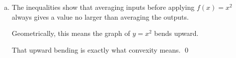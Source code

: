 \documentclass[12pt]{article}
\begin{document}
\begin{enumerate}[(a)]
Summing over all pairs $i<j$,
every square term appears exactly $(n-1)$ times, so
\[
2\sum_{i<j}x_ix_j
\leq
(n-1)\sum_{i=1}^n x_i^2.
\]

Therefore
\[
(x_1+\cdots+x_n)^2
\leq
n\sum_{i=1}^n x_i^2.
\]

Dividing by $n^2$ gives
\[
\left(
\frac{x_1+\cdots+x_n}{n}
\right)^2
\leq
\frac{x_1^2+\cdots+x_n^2}{n}.
\]

\item The inequalities show that averaging inputs before applying $f(x)=x^2$
always gives a value no larger than averaging the outputs.

Geometrically, this means the graph of $y=x^2$ bends upward.

That upward bending is exactly what convexity means. \qed

\end{enumerate}
\end{document}
